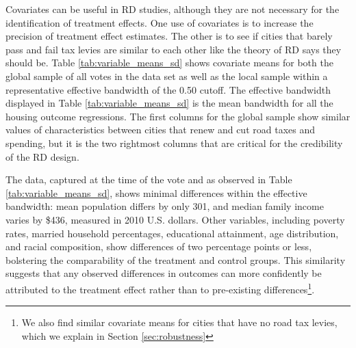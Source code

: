 Covariates can be useful in RD studies, although they are not necessary for the identification of treatment effects.  One use of covariates is to increase the precision of treatment effect estimates.  The other is to see if cities that barely pass and fail tax levies are similar to each other like the theory of RD says they should be. Table \ref{tab:variable_means_sd} shows covariate means for both the global sample of all votes in the data set as well as the local sample within a representative effective bandwidth of the 0.50 cutoff. The effective bandwidth displayed in Table \ref{tab:variable_means_sd} is the mean bandwidth for all the housing outcome regressions. The first columns for the global sample show similar values of characteristics between cities that renew and cut road taxes and spending, but it is the two rightmost columns that are critical for the credibility of the RD design.   

The data, captured at the time of the vote and as observed in Table \ref{tab:variable_means_sd}, shows minimal differences within the effective bandwidth: mean population differs by only 301, and median family income varies by \$436, measured in 2010 U.S. dollars. Other variables, including poverty rates, married household percentages, educational attainment, age distribution, and racial composition, show differences of two percentage points or less, bolstering the comparability of the treatment and control groups. This similarity suggests that any observed differences in outcomes can more confidently be attributed to the treatment effect rather than to pre-existing differences\footnote{We also find similar covariate means for cities that have no road tax levies, which we explain in Section \ref{sec:robustness}}.

